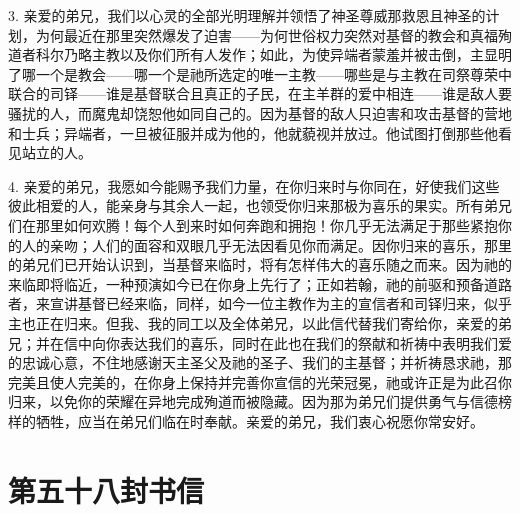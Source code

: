 3. 亲爱的弟兄，我们以心灵的全部光明理解并领悟了神圣尊威那救恩且神圣的计划，为何最近在那里突然爆发了迫害——为何世俗权力突然对基督的教会和真福殉道者科尔乃略主教以及你们所有人发作；如此，为使异端者蒙羞并被击倒，主显明了哪一个是教会——哪一个是祂所选定的唯一主教——哪些是与主教在司祭尊荣中联合的司铎——谁是基督联合且真正的子民，在主羊群的爱中相连——谁是敌人要骚扰的人，而魔鬼却饶恕他如同自己的。因为基督的敌人只迫害和攻击基督的营地和士兵；异端者，一旦被征服并成为他的，他就藐视并放过。他试图打倒那些他看见站立的人。\par

4. 亲爱的弟兄，我愿如今能赐予我们力量，在你归来时与你同在，好使我们这些彼此相爱的人，能亲身与其余人一起，也领受你归来那极为喜乐的果实。所有弟兄们在那里如何欢腾！每个人到来时如何奔跑和拥抱！你几乎无法满足于那些紧抱你的人的亲吻；人们的面容和双眼几乎无法因看见你而满足。因你归来的喜乐，那里的弟兄们已开始认识到，当基督来临时，将有怎样伟大的喜乐随之而来。因为祂的来临即将临近，一种预演如今已在你身上先行了；正如若翰，祂的前驱和预备道路者，来宣讲基督已经来临，同样，如今一位主教作为主的宣信者和司铎归来，似乎主也正在归来。但我、我的同工以及全体弟兄，以此信代替我们寄给你，亲爱的弟兄；并在信中向你表达我们的喜乐，同时在此也在我们的祭献和祈祷中表明我们爱的忠诚心意，不住地感谢天主圣父及祂的圣子、我们的主基督；并祈祷恳求祂，那完美且使人完美的，在你身上保持并完善你宣信的光荣冠冕，祂或许正是为此召你归来，以免你的荣耀在异地完成殉道而被隐藏。因为那为弟兄们提供勇气与信德榜样的牺牲，应当在弟兄们临在时奉献。亲爱的弟兄，我们衷心祝愿你常安好。\par



\section{第五十八封书信}

\par

\par


